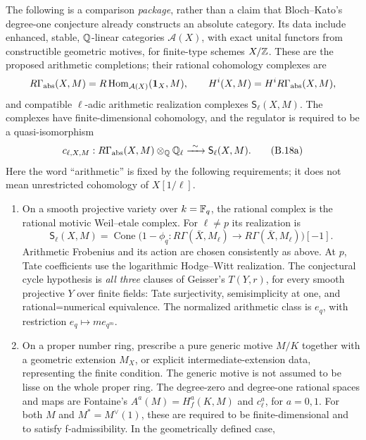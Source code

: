 \begin{definition}
\label{def:B-corrected-comparison-package}
The following is a comparison \emph{package}, rather than a claim that
Bloch--Kato's degree-one conjecture already constructs an absolute
category.  Its data include enhanced, stable, \(\mathbb Q\)-linear
categories \(\mathcal A(X)\), with exact unital functors from
constructible geometric motives, for finite-type schemes
\(X/\mathbb Z\).  These are the proposed arithmetic completions;
their rational cohomology complexes are
\[
 R\Gamma_{\rm abs}(X,M)
   =R\operatorname{Hom}_{\mathcal A(X)}(\mathbf1_X,M),
 \qquad H^i(X,M)=H^iR\Gamma_{\rm abs}(X,M),
\]
and compatible \(\ell\)-adic arithmetic realization complexes
\(\mathsf S_\ell(X,M)\).  The complexes have finite-dimensional
cohomology, and the regulator is required to be a quasi-isomorphism
\[
 c_{\ell,X,M}:R\Gamma_{\rm abs}(X,M)\otimes_\mathbb Q\mathbb Q_\ell
       \xrightarrow{\ \sim\ }\mathsf S_\ell(X,M).
 \tag{B.18a}
\]
Here the word ``arithmetic'' is fixed by the following requirements;
it does not mean unrestricted cohomology of \(X[1/\ell]\).
\begin{enumerate}
\item On a smooth projective variety over \(k=\mathbb F_q\), the rational
complex is the rational motivic Weil--etale complex.  For
\(\ell\ne p\) its realization is
\[
 \mathsf S_\ell(X,M)=
 \operatorname{Cone}\bigl(1-\phi_q:
 R\Gamma(\bar X,M_\ell)\longrightarrow
 R\Gamma(\bar X,M_\ell)\bigr)[-1].
\]
Arithmetic Frobenius and its action are chosen consistently as above.
At \(p\), Tate coefficients use the logarithmic Hodge--Witt
realization.  The conjectural cycle hypothesis is \emph{all three}
clauses of Geisser's \(T(Y,r)\), for every smooth projective
\(Y\) over finite fields: Tate surjectivity, semisimplicity at one,
and rational=numerical equivalence.  The normalized arithmetic class
is \(e_q\), with restriction \(e_q\mapsto m e_{q^m}\).
\item On a proper number ring, prescribe a pure generic motive
\(M/K\) together with a geometric extension \(M_X\), or
explicit intermediate-extension data, representing the finite
condition.  The generic motive is not assumed to be lisse on
the whole proper ring.  The degree-zero and degree-one rational spaces and maps
are Fontaine's \(A^a(M)=H_f^a(K,M)\) and
\(c^a_\ell\), for \(a=0,1\).  For both \(M\) and
\(M^*=M^\vee(1)\), these are required to be finite-dimensional
and to satisfy f-admissibility.  In the geometrically defined case,

\end{enumerate}
\end{definition}
